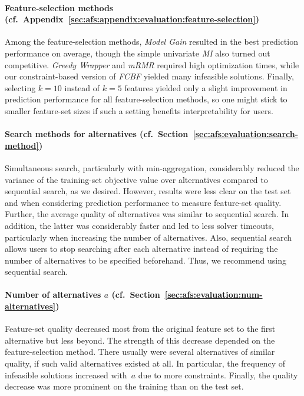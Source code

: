 \documentclass{article}
\theoremstyle{definition}
\begin{document}
\paragraph{Feature-selection methods (cf.~Appendix~\ref{sec:afs:appendix:evaluation:feature-selection})}

Among the feature-selection methods, \emph{Model Gain} resulted in the best prediction performance on average, though the simple univariate \emph{MI} also turned out competitive.
\emph{Greedy Wrapper} and \emph{mRMR} required high optimization times, while our constraint-based version of \emph{FCBF} yielded many infeasible solutions.
Finally, selecting $k=10$ instead of $k=5$ features yielded only a slight improvement in prediction performance for all feature-selection methods, so one might stick to smaller feature-set sizes if such a setting benefits interpretability for users.

\paragraph{Search methods for alternatives (cf.~Section~\ref{sec:afs:evaluation:search-method})}

Simultaneous search, particularly with min-aggregation, considerably reduced the variance of the training-set objective value over alternatives compared to sequential search, as we desired.
However, results were less clear on the test set and when considering prediction performance to measure feature-set quality.
Further, the average quality of alternatives was similar to sequential search.
In addition, the latter was considerably faster and led to less solver timeouts, particularly when increasing the number of alternatives.
Also, sequential search allows users to stop searching after each alternative instead of requiring the number of alternatives to be specified beforehand.
Thus, we recommend using sequential search.

\paragraph{Number of alternatives $a$ (cf.~Section~\ref{sec:afs:evaluation:num-alternatives})}

Feature-set quality decreased most from the original feature set to the first alternative but less beyond.
The strength of this decrease depended on the feature-selection method.
There usually were several alternatives of similar quality, if such valid alternatives existed at all.
In particular, the frequency of infeasible solutions increased with~$a$ due to more constraints.
Finally, the quality decrease was more prominent on the training than on the test set.
\end{document}
